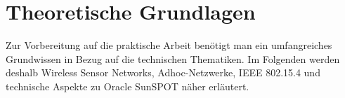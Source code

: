 \chapter{Theoretische Grundlagen}\label{c:Grundlagen}

Zur Vorbereitung auf die praktische Arbeit benötigt man ein umfangreiches Grundwissen in Bezug auf die technischen Thematiken. Im Folgenden werden deshalb Wireless Sensor Networks, Adhoc-Netzwerke, IEEE 802.15.4 und technische Aspekte zu Oracle SunSPOT näher erläutert.





